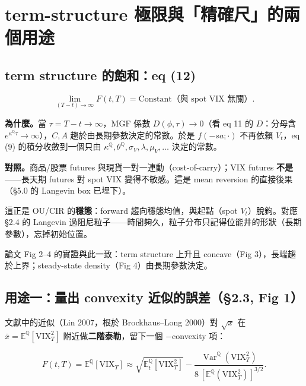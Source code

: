 \documentclass[12pt, a4paper]{article}
\theoremstyle{remark}
\newcommand{\E}{\mathbb{E}}
\newcommand{\Q}{\mathbb{Q}}
\newcommand{\VIX}{\mathrm{VIX}}
\newcommand{\Var}{\operatorname{Var}}
\begin{document}
\section{term-structure 極限與「精確尺」的兩個用途}

\subsection{term structure 的飽和：eq (12)}

\begin{equation}
  \lim_{(T-t)\to\infty} F(t,T) = \text{Constant（與 spot VIX 無關）}.
  \tag{12}
\end{equation}

\textbf{為什麼。}當 $\tau=T-t\to\infty$，MGF 係數 $D(\phi,\tau)\to0$（看 eq 11 的 $D$：分母含 $e^{\kappa^\Q\tau}\to\infty$），$C,A$ 趨於由長期參數決定的常數。於是 $f(-sa;\cdot)$ 不再依賴 $V_t$，eq (9) 的積分收斂到一個只由 $\kappa^\Q,\theta^\Q,\sigma_V,\lambda,\mu_V,\dots$ 決定的常數。

\textbf{對照。}商品/股票 futures 與現貨一對一連動（cost-of-carry）；VIX futures \textbf{不是}——長天期 futures 對 spot VIX 變得不敏感。這是 mean reversion 的直接後果（§5.0 的 Langevin box 已埋下）。

\begin{physicsbox}[title={一句呼應（非新類比）}]
這正是 OU/CIR 的\textbf{穩態}：forward 趨向穩態均值，與起點（spot $V_t$）脫鉤。對應 §2.4 的 Langevin 過阻尼粒子——時間夠久，粒子分布只記得位能井的形狀（長期參數），忘掉初始位置。
\end{physicsbox}

論文 Fig 2--4 的實證與此一致：term structure 上升且 concave（Fig 3），長端趨於上界；steady-state density（Fig 4）由長期參數決定。

\subsection{用途一：量出 convexity 近似的誤差（§2.3, Fig 1）}

文獻中的近似（Lin 2007，根於 Brockhaus--Long 2000）對 $\sqrt{x}$ 在 $\bar x=\E^\Q[\VIX_T^2]$ 附近做\textbf{二階泰勒}，留下一個 $-$convexity 項：

\begin{equation}
  F(t,T)=\E^\Q[\VIX_T]\approx \sqrt{\E_t^\Q[\VIX_T^2]}
  - \frac{\Var^\Q(\VIX_T^2)}{8\,[\E^\Q(\VIX_T^2)]^{3/2}}.
  \tag{13}
\end{equation}
\end{document}
